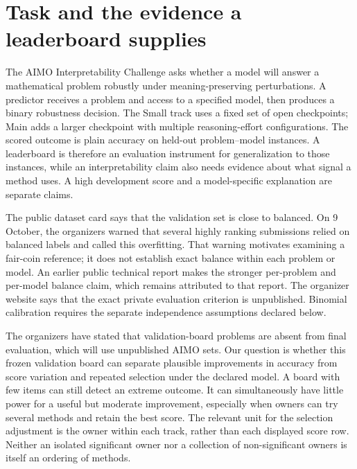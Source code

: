 \section{Task and the evidence a leaderboard supplies}

The AIMO Interpretability Challenge asks whether a model will answer a mathematical problem robustly under meaning-preserving perturbations. A predictor receives a problem and access to a specified model, then produces a binary robustness decision. The Small track uses a fixed set of open checkpoints; Main adds a larger checkpoint with multiple reasoning-effort configurations. The scored outcome is plain accuracy on held-out problem--model instances. A leaderboard is therefore an evaluation instrument for generalization to those instances, while an interpretability claim also needs evidence about what signal a method uses. A high development score and a model-specific explanation are separate claims. \citep{S1,S2,S3,S12}


The public dataset card says that the validation set is close to balanced. On 9 October, the organizers warned that several highly ranking submissions relied on balanced labels and called this overfitting. That warning motivates examining a fair-coin reference; it does not establish exact balance within each problem or model. An earlier public technical report makes the stronger per-problem and per-model balance claim, which remains attributed to that report. The organizer website says that the exact private evaluation criterion is unpublished. Binomial calibration requires the separate independence assumptions declared below. \citep{S1,S2,S7,S13}


The organizers have stated that validation-board problems are absent from final evaluation, which will use unpublished AIMO sets. \citep{S13} Our question is whether this frozen validation board can separate plausible improvements in accuracy from score variation and repeated selection under the declared model. A board with few items can still detect an extreme outcome. It can simultaneously have little power for a useful but moderate improvement, especially when owners can try several methods and retain the best score. The relevant unit for the selection adjustment is the owner within each track, rather than each displayed score row. Neither an isolated significant owner nor a collection of non-significant owners is itself an ordering of methods.


